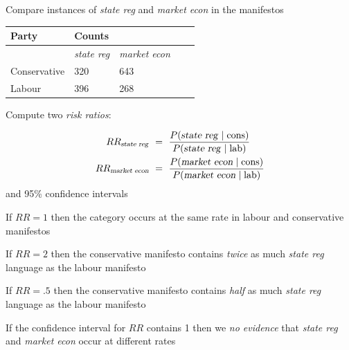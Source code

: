 \documentclass{mediumfoils}
\begin{document}
Compare instances of \textsl{state reg} and \textsl{market econ} in the manifestos\\
\begin{center}
\begin{tabular}{lllll}\toprule
Party & \multicolumn{2}{l}{Counts}  \\ \midrule 
      & \textsl{state reg}    &    \textsl{market econ}  \\ 
Conservative  & 320   & 643 \\ 
Labour   & 396   & 268      \\ \bottomrule
\end{tabular}
\end{center}


Compute two \textsl{risk ratios}:

\begin{align*}
RR_{\text{\textsl{state reg}}} & ~=~ \frac{P(\text{\textsl{state reg}} \mid \text{cons})}
{P(\text{\textsl{state reg}} \mid \text{lab})}\\
RR_{\text{\textsl{market econ}}} & ~=~ \frac{P(\text{\textsl{market econ}} \mid \text{cons})}
{P(\text{\textsl{market econ}} \mid \text{lab})}
\end{align*}
and 95\% confidence intervals

%
%
%

If $RR=1$ then the category occurs at the same rate in labour and conservative manifestos

If $RR=2$ then the conservative manifesto contains \textsl{twice} as much \textsl{state reg} language as the labour manifesto

If $RR=.5$ then the conservative manifesto contains \textsl{half} as much \textsl{state reg} language as the labour manifesto

If the confidence interval for $RR$ contains 1 then we \textsl{no evidence} that \textsl{state reg} and \textsl{market econ} occur at different rates
\end{document}
